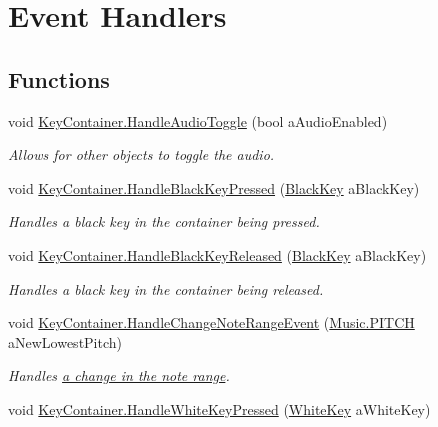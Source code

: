 \hypertarget{group___key_contain_handlers}{}\section{Event Handlers}
\label{group___key_contain_handlers}
\subsection*{Functions}
\begin{DoxyCompactItemize}
\item 
void \hyperlink{group___key_contain_handlers_ga5fc6752f438bda64f0f860da0788fc13}{Key\+Container.\+Handle\+Audio\+Toggle} (bool a\+Audio\+Enabled)
\begin{DoxyCompactList}\small\item\em Allows for other objects to toggle the audio. \end{DoxyCompactList}\item 
void \hyperlink{group___key_contain_handlers_ga05cc2543fd9772b26e27bf4f6247ab47}{Key\+Container.\+Handle\+Black\+Key\+Pressed} (\hyperlink{class_black_key}{Black\+Key} a\+Black\+Key)
\begin{DoxyCompactList}\small\item\em Handles a black key in the container being pressed. \end{DoxyCompactList}\item 
void \hyperlink{group___key_contain_handlers_ga5a0c5565c5ebc6026b3122f487e51704}{Key\+Container.\+Handle\+Black\+Key\+Released} (\hyperlink{class_black_key}{Black\+Key} a\+Black\+Key)
\begin{DoxyCompactList}\small\item\em Handles a black key in the container being released. \end{DoxyCompactList}\item 
void \hyperlink{group___key_contain_handlers_ga0d82098e4f886f77a33f9d5ed13fe195}{Key\+Container.\+Handle\+Change\+Note\+Range\+Event} (\hyperlink{group___music_enums_ga508f69b199ea518f935486c990edac1d}{Music.\+P\+I\+T\+CH} a\+New\+Lowest\+Pitch)
\begin{DoxyCompactList}\small\item\em Handles \hyperlink{group___v_i_m_event_types_class_virtual_instrument_manager_1_1_change_note_range_event}{a change in the note range}. \end{DoxyCompactList}\item 
void \hyperlink{group___key_contain_handlers_ga4e2c5e8be389a7514429910e7d61f028}{Key\+Container.\+Handle\+White\+Key\+Pressed} (\hyperlink{class_white_key}{White\+Key} a\+White\+Key)

\end{DoxyCompactItemize}
